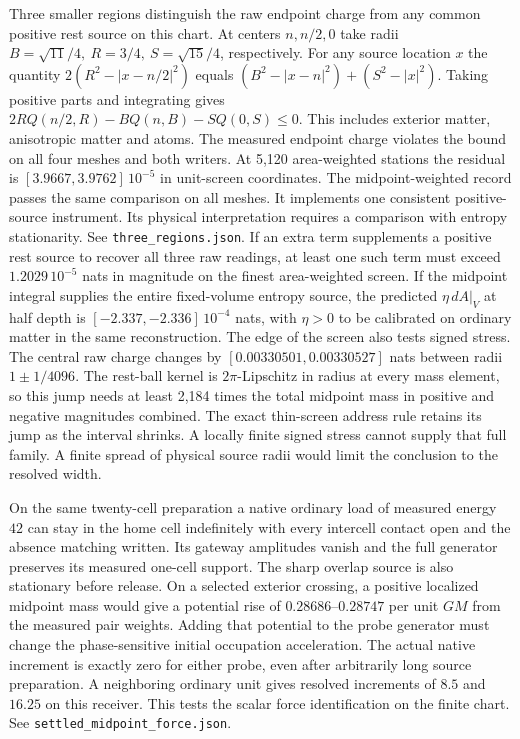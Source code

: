 \documentclass[11pt]{article}
\begin{document}
Three smaller regions distinguish the raw endpoint charge from any
common positive rest source on this chart. At centers \(n,n/2,0\)
take radii \(B=\sqrt{11}/4,\ R=3/4,\ S=\sqrt{15}/4\), respectively.
For any source location \(x\) the quantity \(2(R^2-|x-n/2|^2)\)
equals \((B^2-|x-n|^2)+(S^2-|x|^2)\). Taking positive parts
and integrating gives \(2R Q(n/2,R)-B Q(n,B)-S Q(0,S)\le0\).
This includes exterior matter, anisotropic matter and atoms.
The measured endpoint charge violates the bound on all four meshes
and both writers. At 5,120 area-weighted stations the residual is
\([3.9667,3.9762]\,10^{-5}\) in unit-screen coordinates. The
midpoint-weighted record passes the same comparison on all meshes.
It implements one consistent positive-source instrument. Its physical
interpretation requires a comparison with entropy stationarity. See
\texttt{three\_regions.json}. If an extra term supplements a positive
rest source to recover all three raw readings, at least one such
term must exceed \(1.2029\,10^{-5}\) nats in magnitude on the finest
area-weighted screen. If the midpoint integral supplies the entire
fixed-volume entropy source, the predicted \(\eta\,dA|_V\) at half
depth is \([-2.337,-2.336]\,10^{-4}\) nats, with \(\eta>0\)
to be calibrated on ordinary matter in the same reconstruction.
The edge of the screen also tests signed stress.
The central raw charge changes by \([0.00330501,0.00330527]\) nats
between radii \(1\pm1/4096\). The rest-ball kernel is
\(2\pi\)-Lipschitz in radius at every mass element, so this jump needs
at least 2,184 times the total midpoint mass in positive and negative
magnitudes combined. The exact thin-screen address rule retains its
jump as the interval shrinks. A locally finite signed stress cannot
supply that full family. A finite spread of physical source radii would
limit the conclusion to the resolved width.

On the same twenty-cell preparation a native ordinary load of measured
energy \(42\) can stay in the home cell indefinitely with every
intercell contact open and the absence matching written. Its gateway amplitudes vanish and the full generator
preserves its measured one-cell support. The sharp overlap source is
also stationary before release. On a selected exterior crossing, a
positive localized midpoint mass would give a potential rise of
\(0.28686\)--\(0.28747\) per unit \(GM\) from the measured pair
weights. Adding that potential to the probe generator must change
the phase-sensitive initial occupation acceleration. The actual
native increment is exactly zero for either probe, even after
arbitrarily long source preparation. A neighboring ordinary unit
gives resolved increments of \(8.5\) and \(16.25\) on this receiver.
This tests the scalar force identification on the finite chart. See
\texttt{settled\_midpoint\_force.json}.
\end{document}
